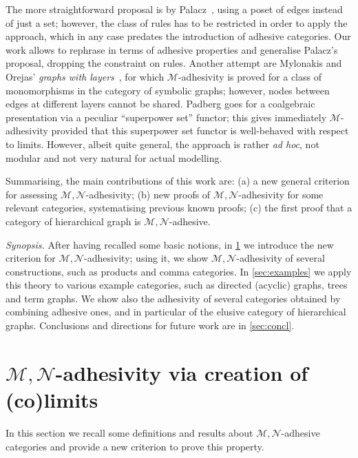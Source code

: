 \documentclass[runningheads,envcountsect]{lmcs}
\theoremstyle{plain}
\theoremstyle{definition}
\begin{document}
The more straightforward proposal is by Palacz~\cite{palacz2004algebraic}, using a poset of edges instead of just a set; however, the class of rules has to be restricted 
in order to apply the approach, which in any case predates the introduction of adhesive categories.
Our work allows to rephrase in terms of adhesive properties and generalise Palacz's proposal, dropping the constraint on rules.
%
Another attempt are Mylonakis and Orejas' \emph{graphs with layers}~\cite{nyko2012}, for which 
$\mathcal{M}$-adhesivity is proved for a class of monomorphisms in the category of symbolic graphs; however, nodes between edges at different layers cannot be shared. 
%
Padberg \cite{Padberg17} goes  for a coalgebraic presentation via a peculiar ``superpower set'' functor; this gives immediately $\mathcal{M}$-adhesivity provided that this superpower set functor is well-behaved with respect to limits. However, albeit quite general, the approach is rather \emph{ad hoc}, not modular and not very natural for actual modelling.
% 

Summarising, the main contributions of this work are: 
(a) a new general criterion for assessing $\mathcal{M}, \mathcal{N}$-adhesivity; %
(b) new proofs of $\mathcal{M}, \mathcal{N}$-adhesivity for some relevant categories, systematising previous known proofs;
(c) the first proof that a category of hierarchical graph is $\mathcal{M}, \mathcal{N}$-adhesive.
\vfill

\noindent\textit{Synopsis.} 
After having recalled some basic notions, in \cref{sec:criterion} we introduce the new criterion for $\mathcal{M}, \mathcal{N}$-adhesivity; using it, we show $\mathcal{M}, \mathcal{N}$-adhesivity of several constructions, such as products and comma categories.
In \cref{sec:examples} we apply this theory to various example categories, such as directed (acyclic) graphs, trees and term graphs. We show also the adhesivity of several categories obtained by combining adhesive ones, and in particular of the elusive category of hierarchical graphs.
Conclusions and directions for future work are in \cref{sec:concl}. 

\section{$\mathcal{M}, \mathcal{N}$-adhesivity via creation of (co)limits}\label{sec:criterion}
In this section we recall some definitions and results about $\mathcal{M}, \mathcal{N}$-adhesive categories and provide a new criterion to prove this property. 
\vspace{-0.24cm}
\end{document}
